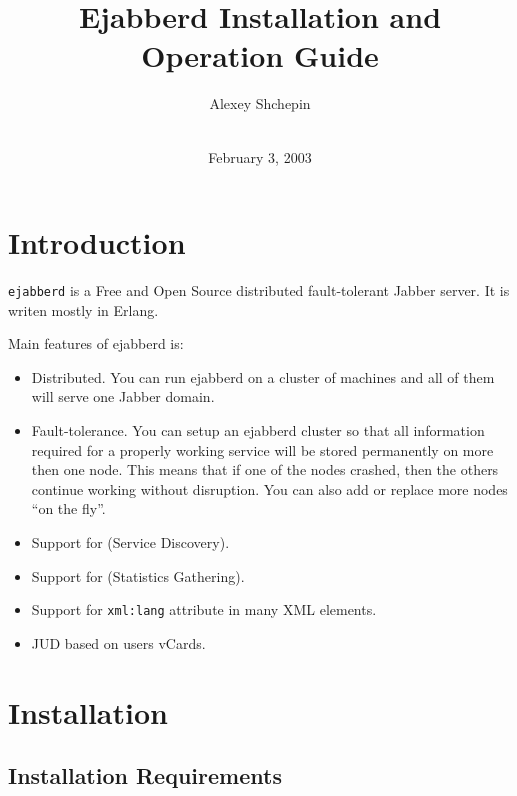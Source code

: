 \documentclass[10pt]{article}
\title{Ejabberd Installation and Operation Guide}
\author{Alexey Shchepin \\
  \ahrefurl{mailto:alexey@sevcom.net} \\
  \ahrefurl{xmpp:aleksey@jabber.ru}}
\date{February 3, 2003}
\newcommand{\logoscale}{0.7}
\newcommand{\insscaleimg}[2]{
  \imgsrc{#2}{}
  \begin{latexonly}
    \scalebox{#1}{\texttt{[image: \#2]}}
  \end{latexonly}
}
\newcommand{\ns}[1]{\texttt{#1}}
\newcommand{\ejabberd}{\texttt{ejabberd}}
\newcommand{\Jabber}{Jabber}
\begin{document}
\begin{titlepage}
  \maketitle{}
  
  {\centering
    \insscaleimg{\logoscale}{logo.png}
    \par
  }
\end{titlepage}

\newpage
\section{Introduction}
\label{sec:intro}

\ejabberd{} is a Free and Open Source distributed fault-tolerant \Jabber{}
server.  It is writen mostly in Erlang.

Main features of ejabberd is:
\begin{itemize}
\item Distributed.  You can run ejabberd on a cluster of machines and
  all of them will serve one Jabber domain.
\item Fault-tolerance. You can setup an ejabberd cluster so that all
  information required for a properly working service will be stored
  permanently on more then one node. This means that if one of the
  nodes crashed, then the others continue working without disruption.
  You can also add or replace more nodes ``on the fly''.
\item Support for
  (Service Discovery).
\item Support for
  (Statistics Gathering).
\item Support for \ns{xml:lang} attribute in many XML elements.
\item JUD based on users vCards.
\end{itemize}




\section{Installation}
\label{sec:installation}


\subsection{Installation Requirements}
\label{sec:installreq}
\end{document}
